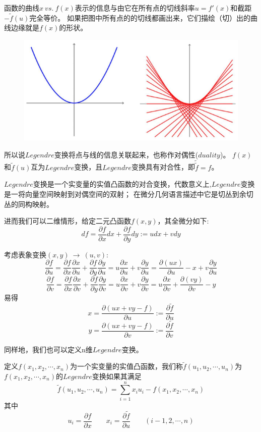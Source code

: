 函数的曲线$x \ vs. \ f(x)$表示的信息与由它在所有点的切线斜率$u=f'(x)$和截距$-\tilde{f}(u)$完全等价。
如果把图中所有点的的切线都画出来，它们描绘（切）出的曲线边缘就是$f(x)$的形状。
\begin{figure}[htbp]
    \centering
    \includegraphics[scale=0.8]{./fig/Legendre Transform/2.png}
\end{figure}
所以说$Legendre$变换将点与线的信息关联起来，也称作对偶性($duality$)。
$f(x)$和$\tilde{f}(u)$互为$Legendre$变换，且$Legendre$变换具有对合性，即$\tilde{\tilde{f}}=f$。

$Legendre$变换是一个实变量的实值凸函数的对合变换，代数意义上,$Legendre$变换是一将向量空间映射到对偶空间的双射；
在微分几何语言描述中它是切丛到余切丛的同构映射。

进而我们可以二维情形，给定二元凸函数$f(x,y)$，其全微分如下:
\[df=\frac{\partial f}{\partial x}dx+\frac{\partial f}{\partial y}dy:=udx+vdy\]

考虑表象变换$(x,y) \ \rightarrow \ (u,v)$:
\[\frac{\partial f}{\partial u}=\frac{\partial f}{\partial x}\frac{\partial x}{\partial u}+\frac{\partial f}{\partial y}\frac{\partial y}{\partial u}=u\frac{\partial x}{\partial u}+v\frac{\partial y}{\partial u}=\frac{\partial (ux)}{\partial u}-x+v\frac{\partial y}{\partial u}\]
\[\frac{\partial f}{\partial v}=\frac{\partial f}{\partial x}\frac{\partial x}{\partial v}+\frac{\partial f}{\partial y}\frac{\partial y}{\partial v}=u\frac{\partial x}{\partial v}+v\frac{\partial y}{\partial v}=u\frac{\partial x}{\partial v}+\frac{\partial (vy)}{\partial v}-y\]
易得
\[x=\frac{\partial (ux+vy-f)}{\partial u}:=\frac{\partial \tilde{f}}{\partial u}\]
\[y=\frac{\partial (ux+vy-f)}{\partial v}:=\frac{\partial \tilde{f}}{\partial v}\]

同样地，我们也可以定义n维$Legendre$变换。

\begin{definition}[n维$Legendre$变换]
    定义$f(x_1,x_2,\cdots,x_n)$为一个实变量的实值凸函数，我们称$\tilde{f}(u_1,u_2,\cdots,u_n)$为$f(x_1,x_2,\cdots,x_n)$的$Legendre$变换如果其满足
    \[\tilde{f}(u_1,u_2,\cdots,u_n)=\sum_{i=1}^nx_iu_i-f(x_1,x_2,\cdots,x_n)\]
    其中
    \[u_i=\frac{\partial f}{\partial x} \qquad x_i=\frac{\partial \tilde{f}}{\partial u} \qquad (i-1,2,\cdots,n)\]
\end{definition}

